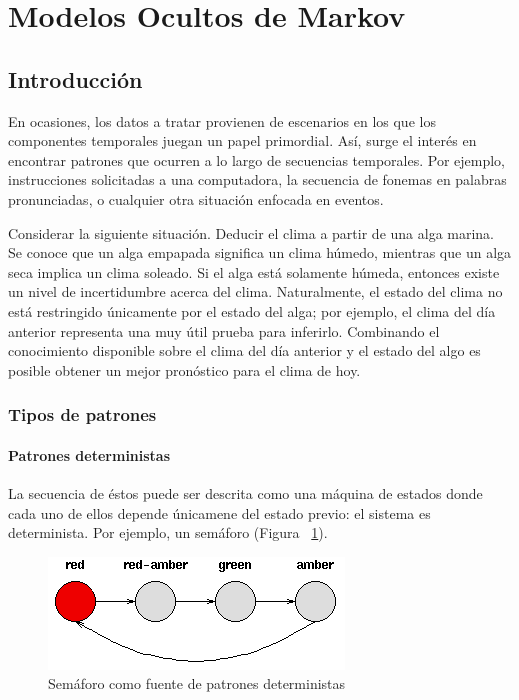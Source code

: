 \documentclass{article}
\begin{document}
\section{Modelos Ocultos de Markov}
\label{sec:modelos_ocultos_de_markov_hidden_markov_models}


\subsection{Introducción}
\label{sub:introducción}
En ocasiones, los datos a tratar provienen de escenarios en los que los componentes temporales juegan un papel primordial.
Así, surge el interés en encontrar patrones que ocurren a lo largo de secuencias temporales.
Por ejemplo, instrucciones solicitadas a una computadora, la secuencia de fonemas en palabras pronunciadas, o cualquier otra situación enfocada en eventos.

Considerar la siguiente situación.
Deducir el clima a partir de una alga marina.
Se conoce que un alga empapada significa un clima húmedo, mientras que un alga seca implica un clima soleado.
Si el alga está solamente húmeda, entonces existe un nivel de incertidumbre acerca del clima.
Naturalmente, el estado del clima no está restringido únicamente por el estado del alga; por ejemplo, el clima del día anterior representa una muy útil prueba para inferirlo.
Combinando el conocimiento disponible sobre el clima del día anterior y el estado del algo es posible obtener un mejor pronóstico para el clima de hoy.

\subsubsection*{Tipos de patrones}
\label{ssub:tipos_de_patrones}

\paragraph{Patrones deterministas} 
\label{par:patrones_determinísticos}
La secuencia de éstos puede ser descrita como una máquina de estados donde cada uno de ellos depende únicamene del estado previo: el sistema es determinista.
Por ejemplo, un semáforo (Figura ~\ref{fig:semaforo}).

\begin{figure}[]
	\centering
	\includegraphics[]{resources/images/traffic-lights}
	\caption{Semáforo como fuente de patrones deterministas}
	\label{fig:semaforo}
\end{figure}
\end{document}

